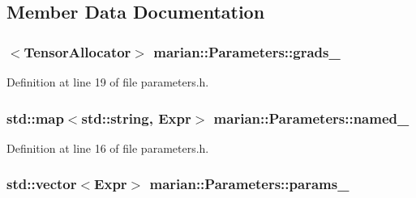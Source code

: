 \subsection{Member Data Documentation}
\subsubsection[{\texorpdfstring{grads\+\_\+}{grads_}}]{$<${\bf Tensor\+Allocator}$>$ marian\+::\+Parameters\+::grads\+\_\+\hspace{0.3cm}{\ttfamily [private]}}\hypertarget{classmarian_1_1Parameters_a256de80bb8acefc81edc634897cd44ed}{}\label{classmarian_1_1Parameters_a256de80bb8acefc81edc634897cd44ed}


Definition at line 19 of file parameters.\+h.

\subsubsection[{\texorpdfstring{named\+\_\+}{named_}}]{\setlength{\rightskip}{0pt plus 5cm}std\+::map$<$std\+::string, {\bf Expr}$>$ marian\+::\+Parameters\+::named\+\_\+\hspace{0.3cm}{\ttfamily [private]}}\hypertarget{classmarian_1_1Parameters_a2581f2bfa392634516ee2cfad9bbed73}{}\label{classmarian_1_1Parameters_a2581f2bfa392634516ee2cfad9bbed73}


Definition at line 16 of file parameters.\+h.

\subsubsection[{\texorpdfstring{params\+\_\+}{params_}}]{\setlength{\rightskip}{0pt plus 5cm}std\+::vector$<${\bf Expr}$>$ marian\+::\+Parameters\+::params\+\_\+\hspace{0.3cm}{\ttfamily [private]}}\hypertarget{classmarian_1_1Parameters_a78220ff4b967b397c7cf5799cd37c4af}{}\label{classmarian_1_1Parameters_a78220ff4b967b397c7cf5799cd37c4af}


